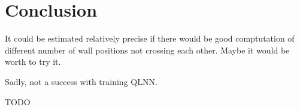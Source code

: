 \chapter{Conclusion}\label{chap:6}

It could be estimated relatively precise if there would be good comptutation
of different number of wall positions not crossing each other. Maybe it would
be worth to try it.

Sadly, not a success with training QLNN.

TODO
